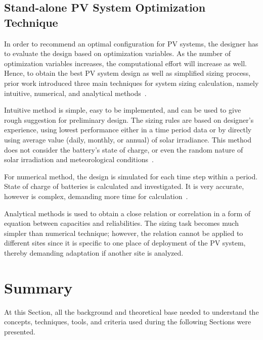 \subsection{Stand-alone PV System Optimization Technique}

In order to recommend an optimal configuration for PV systems, 
the designer has to evaluate the design based on optimization variables. 
As the number of optimization variables increases, the computational effort 
will increase as well. Hence, to obtain the best PV system design as well as 
simplified sizing process, prior work introduced three main techniques 
for system sizing calculation, namely intuitive, numerical, and analytical methods~\cite{Zhou2010}.

Intuitive method is simple, easy to be implemented, and can be used to give 
rough suggestion for preliminary design. The sizing rules are based on designer's experience, 
using lowest performance either in a time period data or by directly using average value 
(daily, monthly, or annual) of solar irradiance. This method does not consider the battery's 
state of charge, or even the random nature of solar irradiation and meteorological conditions~\cite{Alsadi2018}.

For numerical method, the design is simulated for each time step within a period. 
State of charge of batteries is calculated and investigated. It is very accurate, 
however is complex, demanding more time for calculation~\cite{Park2004}.

Analytical methods is used to obtain a close relation or correlation in a form 
of equation between capacities and reliabilities. The sizing task becomes much simpler 
than numerical technique; however, the relation cannot be applied to different sites
since it is specific to one place of deployment of the PV system, 
thereby demanding adaptation if another site is analyzed.

\section{Summary}

At this Section, all the background and theoretical base needed to understand the concepts, techniques, tools, and criteria used during the following Sections were presented.

